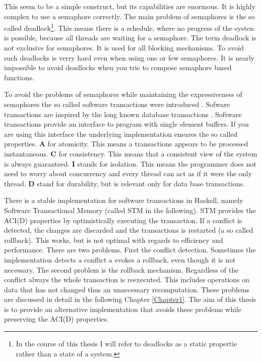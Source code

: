 This seem to be a simple construct, but its capabilities are enormous. It is highly complex to use a semaphore correctly.
The main problem of semaphores is the so called deadlock\footnote{In the course of this thesis I will refer to deadlocks as a static propertie rather than a state of a system.}. 
This means there is a schedule, where no progress of the systen is possible, because all threads are waiting for a semaphore. The term deadlock is not exclusive for semaphores.
It is used for all blocking mechanisms. To avoid such deadlocks is verry hard even when using one or few semaphores. 
It is nearly impossible to avoid deadlocks when you trie to compose semaphore based functions.

To avoid the problems of semaphores while maintaining the expressiveness of semaphores the so called software transactions were introduced \parencite{STMBase}.
Sofware transactions are inspired by the long known database transactions \parencite{DBTrans}. Software transactions provide an interface to program with 
single element buffers. If you are using this interface the underlying implementation ensures the so called  properties. \textbf{A} for atomicity.
This means a transactions appears to be processed instantaneous. \textbf{C} for consistency. This means that a consistent view of the system is always guaranteed.
\textbf{I} stands for isolation. This means the programmer does not need to worry about concurrency and every thread can act as if it were the only thread. 
\textbf{D} stand for durability, but is relevant only for data base transactions. 

There is a stable implementation for software transactions in Haskell, namely Software Transactional Memory (called STM in the following). STM provides the ACI(D)
properties by optimistically executing the transaction. If a conflict is detected, the changes are discarded and the transactions is restarted (a so called rollback). 
This works, but is not optimal with regards to efficiency and performance. There are two problems. First the conflict detection. Sometimes the implementation detects 
a conflict a evokes a rollback, even though it is not necessary. The second problem is the rollback mechanism. Regardless of the conflict always the whole transaction
is reexecuted. This includes operations on data that has not changed thus an unnecessary recomputation. These problems are discussed in detail in the following Chapter 
\ref{Chapter1}. The aim of this thesis is to provide an alternative implementation that avoids these problems while preserving the ACI(D) properties.
